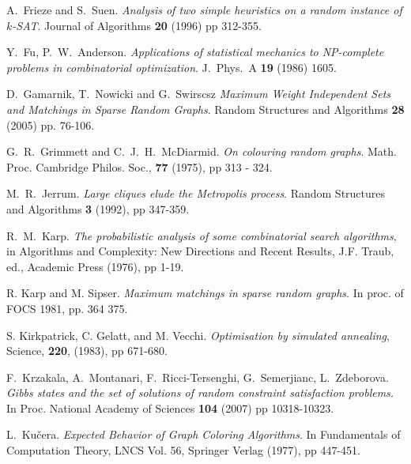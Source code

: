 \documentclass[a4paper,10pt]{article}
\newcommand{\Kucera}{Ku\v{c}era}
\begin{document}
\begin{thebibliography}{00}
 A.~Frieze and  S.~Suen. 
{\em Analysis of two simple heuristics on a random instance of $k$-SAT}. 
Journal of Algorithms \textbf{20} (1996) pp 312-355.


Y.~Fu, P.~W.~Anderson.
{\em Applications of statistical mechanics to NP-complete problems in
 combinatorial optimization}. J.\ Phys.\ A {\bf 19} (1986) 1605.



D.~Gamarnik, T.~Nowicki and G.~Swirscsz
{\em Maximum Weight Independent Sets and Matchings in Sparse Random Graphs}.
Random Structures and Algorithms \textbf{28} (2005) pp. 76-106.



 G.~R.~Grimmett and C.~J.~H.~McDiarmid. 
{\em On colouring random graphs}.
Math. Proc. Cambridge Philos. Soc., \textbf{77} (1975), pp 313 - 324.



 M.~R.~Jerrum. 
{\em Large cliques elude the Metropolis process}.
Random Structures and Algorithms \textbf{3} (1992), pp 347-359.





 R.~M.~Karp. 
{\em The probabilistic analysis of some combinatorial search algorithms}, 
in Algorithms and Complexity: New Directions and Recent Results, J.F. Traub, ed., 
Academic Press (1976), pp 1-19.




 R. Karp and M. Sipser. 
{\em Maximum matchings in sparse random graphs}. 
In proc. of FOCS 1981, pp. 364 375.



S. Kirkpatrick, C. Gelatt, and M. Vecchi.
{\em Optimisation by simulated annealing}, Science, \textbf{220}, (1983), pp 671-680.



F.~Krzakala, A.~Montanari, F.~Ricci-Tersenghi, G.~Semerjianc, 
L.~Zdeborova. {\em Gibbs states and the set of solutions of random constraint 
satisfaction problems.} In Proc. National Academy of Sciences \textbf{104} (2007)
pp 10318-10323.




L.~\Kucera.  
{\em Expected Behavior of Graph Coloring Algorithms}.
In Fundamentals of Computation Theory, LNCS Vol. 56, Springer Verlag (1977), pp 447-451.




\end{thebibliography}
\end{document}
